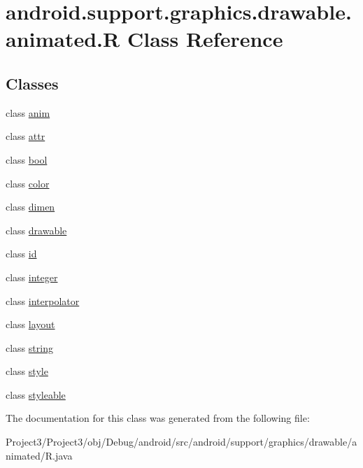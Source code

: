 \hypertarget{classandroid_1_1support_1_1graphics_1_1drawable_1_1animated_1_1R}{}\section{android.\+support.\+graphics.\+drawable.\+animated.\+R Class Reference}
\label{classandroid_1_1support_1_1graphics_1_1drawable_1_1animated_1_1R}
\subsection*{Classes}
\begin{DoxyCompactItemize}
\item 
class \hyperlink{classandroid_1_1support_1_1graphics_1_1drawable_1_1animated_1_1R_1_1anim}{anim}
\item 
class \hyperlink{classandroid_1_1support_1_1graphics_1_1drawable_1_1animated_1_1R_1_1attr}{attr}
\item 
class \hyperlink{classandroid_1_1support_1_1graphics_1_1drawable_1_1animated_1_1R_1_1bool}{bool}
\item 
class \hyperlink{classandroid_1_1support_1_1graphics_1_1drawable_1_1animated_1_1R_1_1color}{color}
\item 
class \hyperlink{classandroid_1_1support_1_1graphics_1_1drawable_1_1animated_1_1R_1_1dimen}{dimen}
\item 
class \hyperlink{classandroid_1_1support_1_1graphics_1_1drawable_1_1animated_1_1R_1_1drawable}{drawable}
\item 
class \hyperlink{classandroid_1_1support_1_1graphics_1_1drawable_1_1animated_1_1R_1_1id}{id}
\item 
class \hyperlink{classandroid_1_1support_1_1graphics_1_1drawable_1_1animated_1_1R_1_1integer}{integer}
\item 
class \hyperlink{classandroid_1_1support_1_1graphics_1_1drawable_1_1animated_1_1R_1_1interpolator}{interpolator}
\item 
class \hyperlink{classandroid_1_1support_1_1graphics_1_1drawable_1_1animated_1_1R_1_1layout}{layout}
\item 
class \hyperlink{classandroid_1_1support_1_1graphics_1_1drawable_1_1animated_1_1R_1_1string}{string}
\item 
class \hyperlink{classandroid_1_1support_1_1graphics_1_1drawable_1_1animated_1_1R_1_1style}{style}
\item 
class \hyperlink{classandroid_1_1support_1_1graphics_1_1drawable_1_1animated_1_1R_1_1styleable}{styleable}
\end{DoxyCompactItemize}


The documentation for this class was generated from the following file\+:\begin{DoxyCompactItemize}
\item 
Project3/\+Project3/obj/\+Debug/android/src/android/support/graphics/drawable/animated/R.\+java\end{DoxyCompactItemize}
